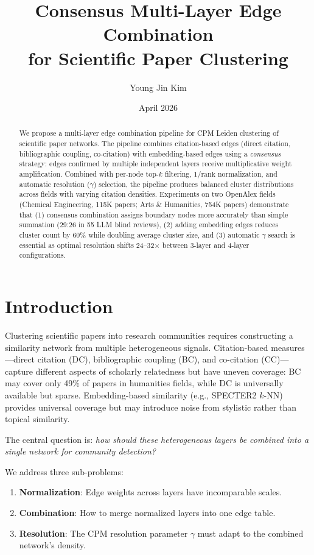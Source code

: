 \documentclass[11pt,a4paper]{article}
\title{\textbf{Consensus Multi-Layer Edge Combination\\for Scientific Paper Clustering}}
\author{Young Jin Kim}
\date{April 2026}
\begin{document}
\maketitle

\begin{abstract}
We propose a multi-layer edge combination pipeline for CPM Leiden clustering of scientific paper networks. The pipeline combines citation-based edges (direct citation, bibliographic coupling, co-citation) with embedding-based edges using a \emph{consensus} strategy: edges confirmed by multiple independent layers receive multiplicative weight amplification. Combined with per-node top-$k$ filtering, $1/\text{rank}$ normalization, and automatic resolution ($\gamma$) selection, the pipeline produces balanced cluster distributions across fields with varying citation densities. Experiments on two OpenAlex fields (Chemical Engineering, 115K papers; Arts \& Humanities, 754K papers) demonstrate that (1) consensus combination assigns boundary nodes more accurately than simple summation (29:26 in 55 LLM blind reviews), (2) adding embedding edges reduces cluster count by 60\% while doubling average cluster size, and (3) automatic $\gamma$ search is essential as optimal resolution shifts 24--32$\times$ between 3-layer and 4-layer configurations.
\end{abstract}

\section{Introduction}

Clustering scientific papers into research communities requires constructing a similarity network from multiple heterogeneous signals. Citation-based measures---direct citation (DC), bibliographic coupling (BC), and co-citation (CC)---capture different aspects of scholarly relatedness but have uneven coverage: BC may cover only 49\% of papers in humanities fields, while DC is universally available but sparse. Embedding-based similarity (e.g., SPECTER2 $k$-NN) provides universal coverage but may introduce noise from stylistic rather than topical similarity.

The central question is: \emph{how should these heterogeneous layers be combined into a single network for community detection?}

We address three sub-problems:
\begin{enumerate}[nosep]
    \item \textbf{Normalization}: Edge weights across layers have incomparable scales.
    \item \textbf{Combination}: How to merge normalized layers into one edge table.
    \item \textbf{Resolution}: The CPM resolution parameter $\gamma$ must adapt to the combined network's density.
\end{enumerate}
\end{document}

